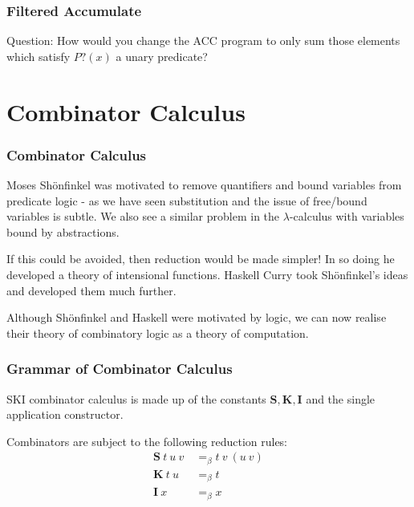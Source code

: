\documentclass{beamer}
\begin{document}
\begin{frame}
	\frametitle{Filtered Accumulate}

	Question: How would you change the ACC program to only sum those elements which satisfy $P?(x)$ a unary predicate?

	\vspace{70mm}

\end{frame}

\section{Combinator Calculus}

\begin{frame}
	\frametitle{Combinator Calculus}

Moses Sh\"{o}nfinkel was motivated to remove quantifiers and bound variables from predicate logic - as we have seen substitution and the issue of free/bound variables is subtle. We also see a similar problem in the $\lambda$-calculus with variables bound by abstractions. 

	If this could be avoided, then reduction would be made simpler! In so doing he developed a theory of intensional functions. Haskell Curry took Sh\"{o}nfinkel's ideas and developed them much further. 
	
	Although Sh\"{o}nfinkel and Haskell were motivated by logic, we can now realise their theory of combinatory logic as a theory of computation. 

\end{frame}

\begin{frame}
	\frametitle{Grammar of Combinator Calculus}

	SKI combinator calculus is made up of the constants $\textbf{S},\textbf{K},\textbf{I}$ and the single application constructor. 


	\vspace{30mm}

	Combinators are subject to the following reduction rules:
	\begin{align*}
		\textbf{S} \ t \ u \ v \ &=_{\beta} t \ v \ (u \ v) \\
		\textbf{K} \ t \ u \ &=_\beta t \\
		\textbf{I} \ x &=_\beta x
	\end{align*}
\end{frame}
\end{document}
